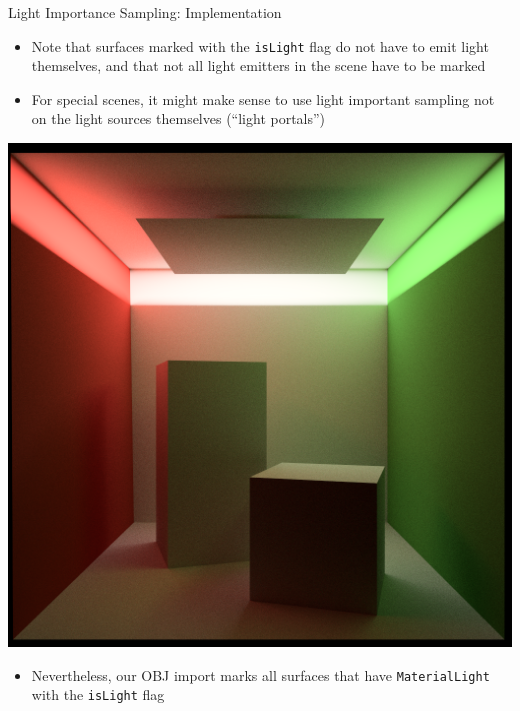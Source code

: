 \documentclass[utf8,stillsansserifmath,fleqn,t]{beamer}
\newcommand{\code}[1]{\texttt{#1}}
\begin{document}
\begin{frame}
\frametitle{\insertsection}
Light Importance Sampling: Implementation
\begin{itemize}
\item Note that surfaces marked with the \code{isLight} flag do not have to emit light themselves,
and that not all light emitters in the scene have to be marked
\end{itemize}
\begin{minipage}{.59\textwidth}
\begin{itemize}
\item For special scenes, it might make sense to use light important sampling not
on the light sources themselves (``light portals'')
\end{itemize}
\end{minipage}\hfill
\begin{minipage}{.4\textwidth}
\includegraphics[width=\textwidth]{./fig/light-portal-example.png}
%
\end{minipage}\hfill
\begin{itemize}
\item Nevertheless, our OBJ import marks all surfaces that have \code{MaterialLight} with the \code{isLight} flag
\end{itemize}
\end{frame}
\end{document}

